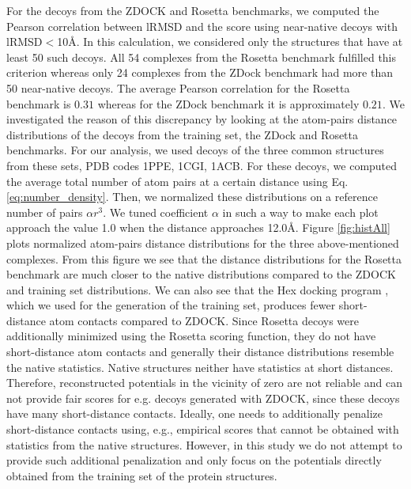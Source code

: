 For the decoys from the ZDOCK and Rosetta benchmarks, we computed the Pearson correlation between lRMSD and the score using near-native decoys with lRMSD$<$10\AA. In this calculation, 
we considered only the structures that have at least 50 such decoys. All 54 complexes from the Rosetta benchmark
fulfilled this criterion whereas only 24 complexes from the ZDock benchmark had more than 50 near-native decoys.
The average Pearson correlation for the Rosetta benchmark is $0.31$ whereas for the ZDock benchmark it is approximately $0.21$.
We investigated the reason of this discrepancy by looking at the atom-pairs distance distributions of the decoys from the training set, the ZDock and Rosetta benchmarks.
For our analysis, we used decoys of the three common structures from these sets, PDB codes 1PPE, 1CGI, 1ACB. For these decoys, we computed the average total number of 
atom pairs at a certain distance using Eq. \ref{eq:number_density}.
Then, we normalized these distributions on a reference number of pairs  ${\alpha r^3}$. We tuned coefficient $\alpha$ in such a way to make each plot approach the value 1.0 
when the distance approaches 12.0\AA.
%
Figure \ref{fig:histAll} plots normalized atom-pairs distance distributions for the three above-mentioned complexes. From this figure we see that 
the distance distributions for the Rosetta benchmark are much closer to the native distributions compared to the ZDOCK and training set distributions. 
We can also see that the Hex docking program \cite{ritchie2000protein}, which we used for the generation of the training set, produces fewer short-distance atom contacts compared to ZDOCK. 
Since Rosetta decoys were additionally minimized using the Rosetta scoring function, they do not have short-distance atom contacts and generally their distance 
distributions resemble the native statistics.
%
%
Native structures neither have statistics at short distances. Therefore, reconstructed potentials in the vicinity of zero are not reliable and can not provide 
fair scores for e.g. decoys generated with ZDOCK, since these decoys have many short-distance contacts. 
%
Ideally, one needs to additionally penalize short-distance contacts using, e.g., empirical scores that cannot be obtained with statistics from the native structures. 
However, in this study we do not attempt to provide such additional penalization and only focus on the potentials directly obtained from the training set of the protein structures.


